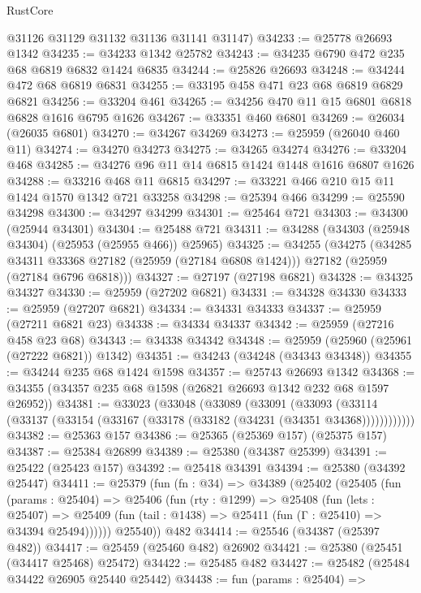\begin{lexlean}{RustCore}
\begin{coremodule}
      @31126
      @31129
      @31132
      @31136
      @31141
      @31147)
@34233 := @25778 @26693 @1342
@34235 := @34233 @1342 @25782
@34243 := @34235 @6790 @472 @235 @68 @6819 @6832 @1424 @6835
@34244 := @25826 @26693
@34248 := @34244 @472 @68 @6819 @6831
@34255 := @33195 @458 @471 @23 @68 @6819 @6829 @6821
@34256 := @33204 @461
@34265 := @34256 @470 @11 @15 @6801 @6818 @6828 @1616 @6795 @1626
@34267 := @33351 @460 @6801
@34269 := @26034 (@26035 @6801)
@34270 := @34267 @34269
@34273 := @25959 (@26040 @460 @11)
@34274 := @34270 @34273
@34275 := @34265 @34274
@34276 := @33204 @468
@34285 := @34276 @96 @11 @14 @6815 @1424 @1448 @1616 @6807 @1626
@34288 := @33216 @468 @11 @6815
@34297 := @33221 @466 @210 @15 @11 @1424 @1570 @1342 @721 @33258
@34298 := @25394 @466
@34299 := @25590 @34298
@34300 := @34297 @34299
@34301 := @25464 @721
@34303 := @34300 (@25944 @34301)
@34304 := @25488 @721
@34311 := @34288 (@34303 (@25948 @34304) (@25953 (@25955 @466)) @25965)
@34325 := @34255
    (@34275
      (@34285 @34311 @33368 @27182 (@25959 (@27184 @6808 @1424)))
      @27182
      (@25959 (@27184 @6796 @6818)))
@34327 := @27197 (@27198 @6821)
@34328 := @34325 @34327
@34330 := @25959 (@27202 @6821)
@34331 := @34328 @34330
@34333 := @25959 (@27207 @6821)
@34334 := @34331 @34333
@34337 := @25959 (@27211 @6821 @23)
@34338 := @34334 @34337
@34342 := @25959 (@27216 @458 @23 @68)
@34343 := @34338 @34342
@34348 := @25959 (@25960 (@25961 (@27222 @6821)) @1342)
@34351 := @34243 (@34248 (@34343 @34348))
@34355 := @34244 @235 @68 @1424 @1598
@34357 := @25743 @26693 @1342
@34368 := @34355 (@34357 @235 @68 @1598 (@26821 @26693 @1342 @232 @68 @1597 @26952))
@34381 := @33023
    (@33048
      (@33089
        (@33091
          (@33093 (@33114 (@33137 (@33154 (@33167 (@33178 (@33182 (@34231 (@34351 @34368))))))))))))
@34382 := @25363 @157
@34386 := @25365 (@25369 @157) (@25375 @157)
@34387 := @25384 @26899
@34389 := @25380 (@34387 @25399)
@34391 := @25422 (@25423 @157)
@34392 := @25418 @34391
@34394 := @25380 (@34392 @25447)
@34411 := @25379
    (fun (fn : @34) =>
    @34389
      (@25402
        (@25405
          (fun (params : @25404) =>
          @25406
            (fun (rty : @1299) =>
            @25408
              (fun (lets : @25407) =>
              @25409 (fun (tail : @1438) => @25411 (fun (Γ : @25410) => @34394 @25494))))))
        @25540))
    @482
@34414 := @25546 (@34387 (@25397 @482))
@34417 := @25459 (@25460 @482) @26902
@34421 := @25380 (@25451 (@34417 @25468) @25472)
@34422 := @25485 @482
@34427 := @25482 (@25484 @34422 @26905 @25440 @25442)
@34438 := fun (params : @25404) =>

\end{coremodule}
\end{lexlean}
